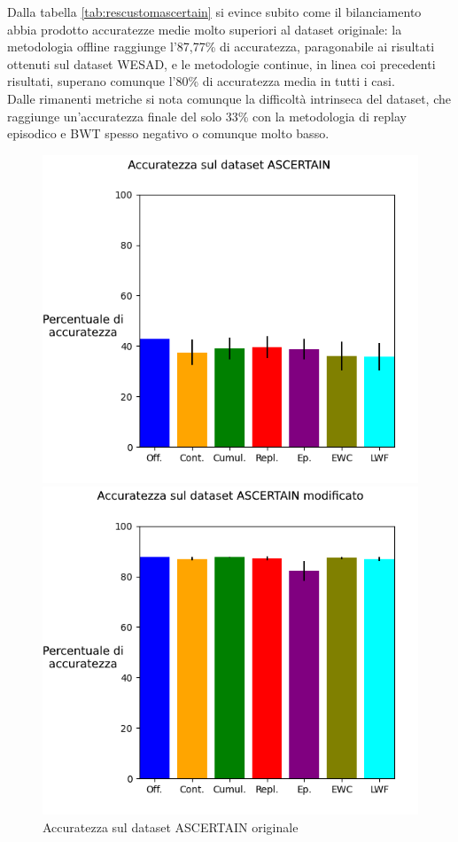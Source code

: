 Dalla tabella \ref{tab:rescustomascertain} si evince subito come il bilanciamento abbia prodotto accuratezze medie molto superiori al dataset originale: la metodologia offline raggiunge l'87,77\% di accuratezza, paragonabile ai risultati ottenuti sul dataset WESAD, e le metodologie continue, in linea coi precedenti risultati, superano comunque l'80\% di accuratezza media in tutti i casi.\\
Dalle rimanenti metriche si nota comunque la difficoltà intrinseca del dataset, che raggiunge un'accuratezza finale del solo 33\% con la metodologia di replay episodico e BWT spesso negativo o comunque molto basso.
\begin{figure}[!tbp]
    \begin{minipage}[b]{0.5\textwidth}
		\includegraphics[width=\textwidth]{img/graphs/ascertain_final_accuracy.png}
		\caption{Accuratezza sul dataset ASCERTAIN originale}
		\label{fig:ascertain_accuracy_graph}
	\end{minipage}
    \hfill
    \begin{minipage}[b]{0.5\textwidth}
		\includegraphics[width=\textwidth]{img/graphs/customascertain_final_accuracy.png}

\end{minipage}
\end{figure}
